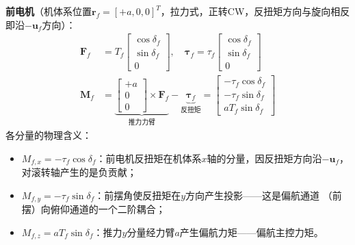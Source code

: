 \documentclass[a4paper,12pt]{ctexart}
\theoremstyle{plain}
\theoremstyle{definition}
\begin{document}
\textbf{前电机}（机体系位置$\bm{r}_f = [+a, 0, 0]^T$，拉力式，正转CW，反扭矩方向与旋向相反即沿$-\bm{u}_f$方向）：
\begin{align}
    \bm{F}_f &= T_f \begin{bmatrix} \cos\delta_f \\ \sin\delta_f \\ 0 \end{bmatrix},
    \quad
    \bm{\tau}_f = \tau_f \begin{bmatrix} \cos\delta_f \\ \sin\delta_f \\ 0 \end{bmatrix}
    \label{eq:front_force} \\
    \bm{M}_f &= \underbrace{\begin{bmatrix} +a \\ 0 \\ 0 \end{bmatrix} \times \bm{F}_f}_{\text{推力力臂}}
             - \underbrace{\bm{\tau}_f}_{\text{反扭矩}}
             = \begin{bmatrix}
                 -\tau_f \cos\delta_f \\
                 -\tau_f \sin\delta_f \\
                 a T_f \sin\delta_f
               \end{bmatrix}
    \label{eq:front_moment}
\end{align}
各分量的物理含义：
\begin{itemize}
    \item $M_{f,x} = -\tau_f \cos\delta_f$：前电机反扭矩在机体系$x$轴的分量，因反扭矩方向沿$-\bm{u}_f$，
          对滚转轴产生的是负贡献；
    \item $M_{f,y} = -\tau_f \sin\delta_f$：前摆角使反扭矩在$y$方向产生投影——这是偏航通道
          （前摆）向俯仰通道的一个二阶耦合；
    \item $M_{f,z} = a T_f \sin\delta_f$：推力$y$分量经力臂$a$产生偏航力矩——偏航主控力矩。
\end{itemize}
\end{document}
